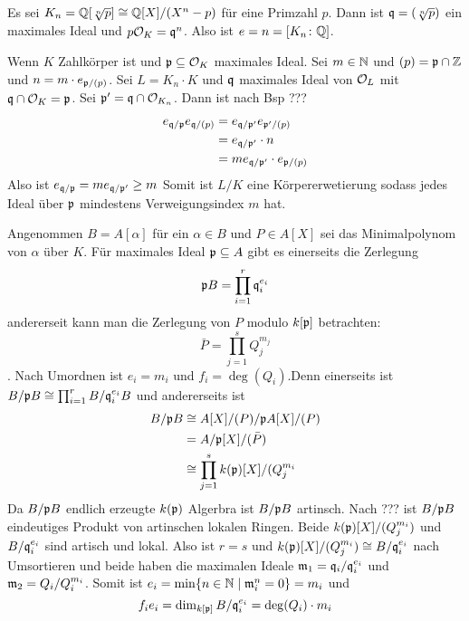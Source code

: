 \begin{Bsp}
	Es sei \(K_n=\mathbb{Q}[\sqrt[n]{p}]\cong \mathbb{Q}[X]/(X^n-p)\) für eine Primzahl \(p\). Dann ist \(\mathfrak{q}=(\sqrt[n]{p})\) ein maximales Ideal und 
	\(p\mathcal{O}_K=\mathfrak{q}^n\). Also ist \(e=n=[K_n\colon \mathbb{Q}]\).
	
\end{Bsp}
\begin{Bsp}
	Wenn \(K\) Zahlkörper ist und \(\mathfrak{p}\subseteq\mathcal{O}_K\) maximales Ideal. Sei \(m\in\mathbb{N}\) und \((p)=\mathfrak{p}\cap \mathbb{Z}\) und \(n=m\cdot e_{\mathfrak{p}/(p)}\).
	Sei \(L=K_n\cdot K\) und \(\mathfrak{q}\) maximales Ideal von \(\mathcal{O}_L\) mit  \(\mathfrak{q}\cap \mathcal{O}_K=\mathfrak{p}\).
	Sei \(\mathfrak{p}'=\mathfrak{q}\cap \mathcal{O}_{K_n}\).
	Dann ist nach Bsp ???
	\begin{align*}
		e_{\mathfrak{q}/\mathfrak{p}}e_{\mathfrak{q}/(p)}&=e_{\mathfrak{q}/\mathfrak{p}'}e_{\mathfrak{p}'/(p)}\\
		&= e_{\mathfrak{q}/\mathfrak{p}'}\cdot n\\
		&= m e_{\mathfrak{q}/\mathfrak{p}'}\cdot e_{\mathfrak{p}/(p)}
	\end{align*}
	Also ist \(e_{\mathfrak{q}/\mathfrak{p}}=m e_{\mathfrak{q}/\mathfrak{p}'}\geq m\)
	Somit ist \(L/K\) eine Körpererwetierung sodass jedes Ideal über \(\mathfrak{p}\) mindestens Verweigungsindex \(m\) hat.
\end{Bsp}
\begin{Bsp}
	Angenommen \(B=A[\alpha]\) für ein \(\alpha\in B\) und \(P\in A[X]\) sei das Minimalpolynom von \(\alpha\) über \(K\).
	Für maximales Ideal \(\mathfrak{p}\subseteq A\) gibt es einerseits die Zerlegung \[\mathfrak{p} B=\prod_{i=1}^r\mathfrak{q}_i^{e_i}\] andererseit kann man die Zerlegung von \(P\) modulo \(k[\mathfrak{p}]\) betrachten:
	\[\bar P=\prod_{j=1}^sQ_j^{m_j}\].
	Nach Umordnen ist \(e_i=m_i\) und \(f_i=\deg(Q_i)\).Denn
	einerseits ist 
	\(B/\mathfrak{p} B\cong \prod_{i=1}^rB/\mathfrak{q}_i^{e_i}B\) und andererseits ist
	\begin{align*}
		B/\mathfrak{p} B&\cong A[X]/(P)/\mathfrak{p} A[X]/(P)\\
		&= A/\mathfrak{p} [X]/(\bar P)\\
		&\cong \prod_{j=1}^sk(\mathfrak{p})[X]/(Q_j^{m_i}
	\end{align*}
	Da \(B/\mathfrak{p} B\) endlich erzeugte \(k(\mathfrak{p})\) Algerbra ist \(B/\mathfrak{p} B\) artinsch.
	Nach ??? ist \(B/\mathfrak{p} B\) eindeutiges Produkt von artinschen lokalen Ringen.
	Beide \(k(\mathfrak{p})[X]/(Q_j^{m_i})\) und \(B/\mathfrak{q}_i^{e_i}\) sind artisch und lokal.
	Also ist \(r=s\) und \(k(\mathfrak{p})[X]/(Q_j^{m_i})\cong B/\mathfrak{q}_i^{e_i}\) nach Umsortieren und beide haben die maximalen Ideale \(\mathfrak{m}_1=\mathfrak{q}_i/\mathfrak{q}_i^{e_i}\) und \(\mathfrak{m}_2=Q_i/Q_i^{m_i}\).
	Somit ist \(e_i=\min\{n\in\mathbb{N}\mid \frak m_i^n=0\}=m_i\) und
	\[f_ie_i=\dim_{k[\mathfrak{p}]}B/\mathfrak{q}_i^{e_i}=\deg(Q_i)\cdot m_i\]
\end{Bsp}
